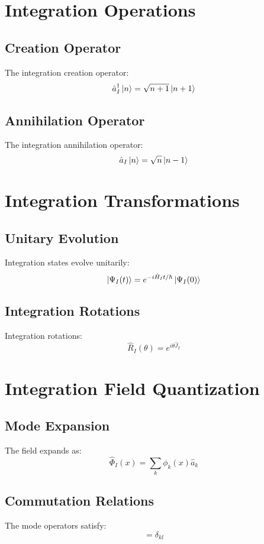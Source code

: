 \documentclass[12pt]{article}
\begin{document}
\section{Integration Operations}
\subsection{Creation Operator}
The integration creation operator:
\begin{equation}
\hat{a}_I^\dagger\ket{n} = \sqrt{n+1}\ket{n+1}
\end{equation}
\subsection{Annihilation Operator}
The integration annihilation operator:
\begin{equation}
\hat{a}_I\ket{n} = \sqrt{n}\ket{n-1}
\end{equation}
\section{Integration Transformations}
\subsection{Unitary Evolution}
Integration states evolve unitarily:
\begin{equation}
\ket{\Psi_I(t)} = e^{-i\hat{H}_It/\hbar}\ket{\Psi_I(0)}
\end{equation}
\subsection{Integration Rotations}
Integration rotations:
\begin{equation}
\hat{R}_I(\theta) = e^{i\theta\hat{J}_I}
\end{equation}
\section{Integration Field Quantization}
\subsection{Mode Expansion}
The field expands as:
\begin{equation}
\hat{\Phi}_I(x) = \sum_k \phi_k(x)\hat{a}_k
\end{equation}
\subsection{Commutation Relations}
The mode operators satisfy:
\begin{equation}
[\hat{a}_k,\hat{a}_l^\dagger] = \delta_{kl}
\end{equation}
\end{document}

